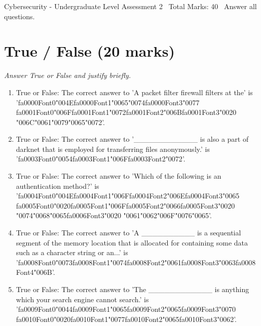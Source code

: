 \documentclass[12pt]{article}
\begin{document}
\begin{center}
Cybersecurity - Undergraduate Level Assessment 2 \
Total Marks: 40 \
Answer all questions.
\end{center}

\section*{True / False (20 marks)}
\textit{Answer True or False and justify briefly.}
\begin{enumerate}[label=\arabic*.]
\item True or False: The correct answer to 'A packet filter firewall filters at the' is '{\csname fa0000Font0\endcsname\char"004E}{\csname fa0000Font1\endcsname\char"0065}{\char"0074}{\csname fa0000Font3\endcsname\char"0077} {\csname fa0001Font0\endcsname\char"006F}{\csname fa0001Font1\endcsname\char"0072}{\csname fa0001Font2\endcsname\char"006B}{\csname fa0001Font3\endcsname\char"0020} {\char"006C}{\char"0061}{\char"0079}{\char"0065}{\char"0072}'.
\item True or False: The correct answer to '\_\_\_\_\_\_\_\_\_\_\_\_ is also a part of darknet that is employed for transferring files anonymously.' is '{\csname fa0003Font0\endcsname\char"0054}{\csname fa0003Font1\endcsname\char"006F}{\csname fa0003Font2\endcsname\char"0072}'.
\item True or False: The correct answer to 'Which of the following is an authentication method?' is '{\csname fa0004Font0\endcsname\char"004E}{\csname fa0004Font1\endcsname\char"006F}{\csname fa0004Font2\endcsname\char"006E}{\csname fa0004Font3\endcsname\char"0065} {\csname fa0005Font0\endcsname\char"0020}{\csname fa0005Font1\endcsname\char"006F}{\csname fa0005Font2\endcsname\char"0066}{\csname fa0005Font3\endcsname\char"0020} {\char"0074}{\char"0068}{\char"0065}{\csname fa0006Font3\endcsname\char"0020} {\char"0061}{\char"0062}{\char"006F}{\char"0076}{\char"0065}'.
\item True or False: The correct answer to 'A \_\_\_\_\_\_\_\_\_\_ is a sequential segment of the memory location that is allocated for containing some data such as a character string or an...' is '{\csname fa0008Font0\endcsname\char"0073}{\csname fa0008Font1\endcsname\char"0074}{\csname fa0008Font2\endcsname\char"0061}{\csname fa0008Font3\endcsname\char"0063}{\csname fa0008Font4\endcsname\char"006B}'.
\item True or False: The correct answer to 'The \_\_\_\_\_\_\_\_\_\_\_\_ is anything which your search engine cannot search.' is '{\csname fa0009Font0\endcsname\char"0044}{\csname fa0009Font1\endcsname\char"0065}{\csname fa0009Font2\endcsname\char"0065}{\csname fa0009Font3\endcsname\char"0070} {\csname fa0010Font0\endcsname\char"0020}{\csname fa0010Font1\endcsname\char"0077}{\csname fa0010Font2\endcsname\char"0065}{\csname fa0010Font3\endcsname\char"0062}'.

\end{enumerate}
\end{document}
